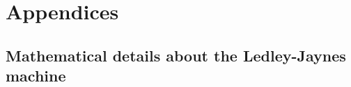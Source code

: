 \documentclass[utf8]{FrontiersinHarvard} %
\newcommand*{\sect}{\S}%
\renewcommand*{\|}[1][]{\nonscript\:#1\vert\nonscript\:\mathopen{}}
\newcommand*{\ad}{Alzheimer's Disease}
\newcommand*{\mci}{Mild Cognitive Impairment}
\newcommand*{\ljm}{Ledley-Jaynes machine}
\newcommand*{\adni}{\textsc{adni}}
\begin{document}
\bigskip%
\appendix
\renewcommand\thesection{\Alph{section}}
\section{Appendices}
\label{sec:appendices}




\subsection{Mathematical details about the \ljm}
\label{sec:maths_tjm}

\end{document}
